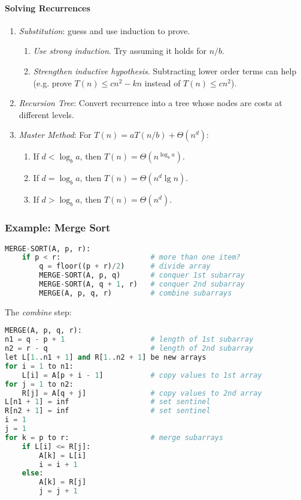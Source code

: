 \documentclass[twocolumn,english]{article}
\begin{document}
\paragraph{Solving Recurrences}
\begin{enumerate}
\item \emph{Substitution}: guess and use induction to prove.
\begin{enumerate}
\item \emph{Use strong induction}. Try assuming it holds for $n/b$.
\item \emph{Strengthen inductive hypothesis}. Subtracting lower order terms
can help (e.g. prove $T\left(n\right)\leq cn^{2}-kn$ instead of $T\left(n\right)\leq cn^{2}$).
\end{enumerate}
\item \emph{Recursion Tree}: Convert recurrence into a tree whose nodes
are costs at different levels.
\item \emph{Master Method}: For $T\left(n\right)=aT\left(n/b\right)+\Theta(n^{d})$:
\begin{enumerate}
\item If $d<\log_{b}a$, then $T\left(n\right)=\Theta\left(n^{\log_{b}a}\right)$.
\item If $d=\log_{b}a$, then $T\left(n\right)=\Theta\left(n^{d}\lg n\right)$.
\item If $d>\log_{b}a$, then $T\left(n\right)=\Theta\left(n^{d}\right)$.
\end{enumerate}
\end{enumerate}

\subsubsection*{Example: Merge Sort}

\begin{lstlisting}[language=Python,basicstyle={\footnotesize\ttfamily},tabsize=4,frame=single]
MERGE-SORT(A, p, r):
	if p < r:                     # more than one item?
		q = floor((p + r)/2)      # divide array
		MERGE-SORT(A, p, q)       # conquer 1st subarray
		MERGE-SORT(A, q + 1, r)   # conquer 2nd subarray
		MERGE(A, p, q, r)         # combine subarrays
\end{lstlisting}

The \emph{combine} step:

\begin{lstlisting}[language=Python,basicstyle={\footnotesize\ttfamily},tabsize=4,frame=single]
MERGE(A, p, q, r):
n1 = q - p + 1                    # length of 1st subarray
n2 = r - q                        # length of 2nd subarray
let L[1..n1 + 1] and R[1..n2 + 1] be new arrays
for i = 1 to n1:
	L[i] = A[p + i - 1]           # copy values to 1st array
for j = 1 to n2:
	R[j] = A[q + j]               # copy values to 2nd array
L[n1 + 1] = inf                   # set sentinel
R[n2 + 1] = inf                   # set sentinel
i = 1
j = 1
for k = p to r:                   # merge subarrays
	if L[i] <= R[j]:
		A[k] = L[i]
		i = i + 1
	else:
		A[k] = R[j]
		j = j + 1
\end{lstlisting}
\end{document}
